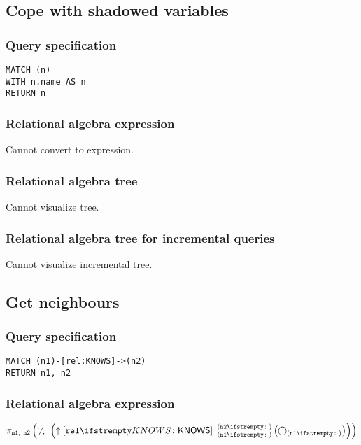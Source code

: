 \subsection{Cope with shadowed variables}

\subsubsection*{Query specification}

\begin{lstlisting}
MATCH (n)
WITH n.name AS n
RETURN n
\end{lstlisting}

\subsubsection*{Relational algebra expression}

Cannot convert to expression.

\subsubsection*{Relational algebra tree}

Cannot visualize tree.

\subsubsection*{Relational algebra tree for incremental queries}

Cannot visualize incremental tree.

\subsection{Get neighbours}

\subsubsection*{Query specification}

\begin{lstlisting}
MATCH (n1)-[rel:KNOWS]->(n2)
RETURN n1, n2
\end{lstlisting}

\subsubsection*{Relational algebra expression}

$\projection{\var{n1},~\var{n2}} \left(\alldifferent{} \left(\expandout{rel}{KNOWS}{n1}{n2}{} \left(\getvertices{n1}{}\right)\right)\right)$


